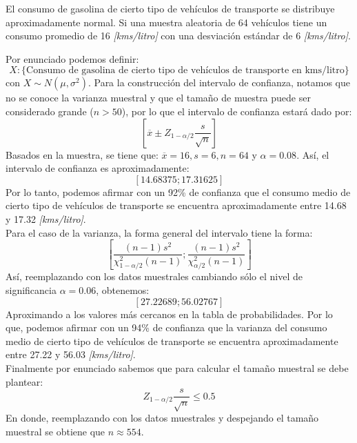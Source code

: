 
\addpoints
\question[20] El consumo de gasolina de cierto tipo de vehículos de transporte se distribuye aproximadamente normal. Si una muestra aleatoria de 64 vehículos tiene un consumo promedio de 16 \textit{[kms/litro]} con una desviación estándar de 6 \textit{[kms/litro]}.

\noaddpoints
{}

\begin{solution}
Por enunciado podemos definir:
$$X :\{ \text{Consumo de gasolina de cierto tipo de vehículos de transporte en kms/litro} \}$$
con $X \sim N(\mu,\sigma^2)$. Para la construcción del intervalo de confianza, notamos que no se conoce la varianza muestral y que el tamaño de muestra puede ser considerado grande ($n>50$), por lo que el intervalo de confianza estará dado por:
$$\left[ \overline{x} \pm Z_{1-\alpha/2}\dfrac{s}{\sqrt{n}}\right]$$
Basados en la muestra, se tiene que: $\overline{x}=16, s=6, n=64$ y $\alpha=0.08$. Así, el intervalo de confianza es aproximadamente:
$$\left[ 14.68375;17.31625\right] $$
Por lo tanto, podemos afirmar con un 92\% de confianza que el consumo medio de cierto tipo de vehículos de transporte se encuentra aproximadamente entre 14.68 y 17.32 \textit{[kms/litro]}.\\

Para el caso de la varianza, la forma general del intervalo tiene la forma:
$$\left[ \dfrac{(n-1)s^{2}}{\chi_{1-\alpha/2}^{2}(n-1)};\dfrac{(n-1)s^{2}}{\chi_{\alpha/2}^{2}(n-1)}\right]$$
Así, reemplazando con los datos muestrales cambiando sólo el nivel de significancia $\alpha=0.06$, obtenemos:
$$\left[ 27.22689;56.02767\right] $$
Aproximando a los valores más cercanos en la tabla de probabilidades. Por lo que, podemos afirmar con un 94\% de confianza que la varianza del consumo medio de cierto tipo de vehículos de transporte se encuentra aproximadamente entre 27.22 y 56.03 \textit{[kms/litro]}.\\

Finalmente por enunciado sabemos que para calcular el tamaño muestral se debe plantear:
$$Z_{1-\alpha/2}\dfrac{s}{\sqrt{n}} \leq 0.5$$
En donde, reemplazando con los datos muestrales y despejando el tamaño muestral se obtiene que $n \approx 554$.
\end{solution}